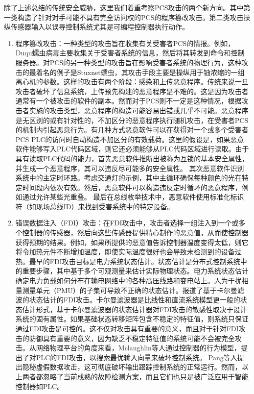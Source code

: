 除了上述总结的传统安全威胁，这里我们着重考察PCS攻击的两个新方向。其中第一类构造了针对对手可能不具有完全访问权的PCS的程序篡改攻击。第二类攻击操纵传感器输入以误导控制系统尤其是可编程控制器执行动作。
\begin{enumerate}
\item 程序篡改攻击：一种类型的攻击旨在收集有关受害者PCS的情报。例如，Duqu蠕虫病毒主要收集关于受害者系统的信息\parencite{Duqu11}，然后将其转发到命令和控制服务器。对PCS的另一种类型的攻击旨在影响受害者系统的物理行为，这种攻击的最着名的例子是Stuxnet蠕虫，其攻击手段主要是操纵用于铀浓缩的一组离心机的参数。这样的攻击有两个阶段：感染和上传恶意程序。传统来说一旦攻击者破坏了信息系统，上传预先构建的恶意程序是不难的。这是因为攻击者通常有一个被攻击的软件的副本。然而对于PCS则不一定是这种情况，根据攻击者实施的攻击类型，恶意程序的构造可能容易出错或几乎不可能。恶意程序是无区别的或有针对性的，不加区分的恶意程序执行随机攻击，在受害者PCS的机制内引起恶意行为。有几种方式恶意软件可以在获得对一个或多个受害者PCS PLC的访问时自动构造不加区分的有效载荷\parencite{McLaughlin112}。这里的假设是，如果恶意软件能够写入PLC代码区域，则它还必须能够从PLC代码区域进行读取。由于具有读取PLC代码的能力，首先恶意软件推断出被称为互锁的基本安全属性\parencite{Chevillat08}，并生成一个恶意程序，其可以违反尽可能多的安全属性。 其次恶意软件识别系统中的主定时环路。考虑交通灯的示例，其中主循环确保每种颜色的光在特定时间段内依次有效。然后，恶意软件可以构造违反定时循环的恶意程序，例如通过允许某些光重叠。 最后在总线枚举技术中，恶意软件使用标准化标识符（如现场总线ID）来找到受害系统中的特定设备\parencite{PROFIBUS10}。
\item 错误数据注入（FDI）攻击：在FDI攻击中，攻击者选择一组注入到一个或多个控制器的传感器，然后向这些传感器提供精心制作的恶意值，从而使控制器获得预期的结果。例如，如果所提供的恶意值告诉控制器温度变得太低，则它将令加热元件不断增加温度，即使实际温度很好也会导致未检测到的设备过热。最早的FDI攻击目标是电力系统状态估计\parencite{Liu10}。状态估计是分布式控制系统中的重要步骤，其中基于多个可观测量来估计实际物理状态。电力系统状态估计确定电力负载如何分布在输电网络中的各种高压线路和变电站上。人为干扰相量测量单元（PMU）的子集可导致不正确的状态估计\parencite{Liu10}。报道了基于卡尔曼滤波的状态估计的FDI攻击。卡尔曼滤波器是比线性和直流系统模型更一般的状态估计形式，基于卡尔曼滤波器的状态估计器对FDI攻击的敏感性取决于设计系统的固有属性\parencite{Liu10}。如果基础状态转移矩阵包含不稳定的特征值，则系统只保证通过FDI攻击是可控的。这不仅对攻击具有重要的意义，而且对于针对FDI攻击的防御具有重要的意义，因为缺乏不稳定特征值的系统可能不会被完全攻击。从网络物理平台的角度来看，Mclaughlin等人\parencite {mclaughlinS2014}通过控制器的行为模型，提出了对PLC的FDI攻击，以搜索最优输入向量来破坏控制系统。 Pang等人\parencite {pang2015}提出隐秘虚假数据攻击，这可彻底破坏输出跟踪控制系统的正常运行。然而，以上两者都忽略了当前成熟的故障检测方案\parencite{roth2012,garcia2012,klein2005}，而且它们也只是被广泛应用于智能控制器如PLC。

\end{enumerate}




